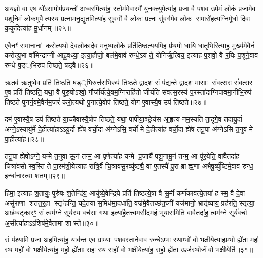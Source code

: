 {\anuvakamend[{भू॒या॒स्त॒ स्व॒स्तयेऽग्ने॑ पुष्यासं धृ॒षद्व॑र्ण॒मेका॒न्नत्रि॒ꣳ॒शच्च॑॥६॥}]}

अय॑ज्ञो॒ वा ए॒ष यो॑ऽसा॒मोप॑प्र॒यन्तो॑ अध्व॒रमित्या॑ह॒ स्तोम॑मे॒वास्मै॑ युन॒क्त्युपेत्या॑ह प्र॒जा वै प॒शव॒ उपे॒मं लो॒कं प्र॒जामे॒व प॒शूनि॒मं लो॒कमुपैत्य॒स्य प्र॒त्नामनु॒द्युत॒मित्या॑ह सुव॒र्गो वै लो॒कः प्र॒त्नः सु॑व॒र्गमे॒व लो॒क स॒मारो॑हत्य॒ग्निर्मू॒र्धा दि॒वः क॒कुदित्या॑ह मू॒र्धानम्॥२५॥

ए॒वैनꣳ॑ समा॒नानां करो॒त्यथो॑ देवलो॒कादे॒व म॑नुष्यलो॒के प्रति॑तिष्ठत्य॒यमि॒ह प्र॑थ॒मो धा॑यि धा॒तृभि॒रित्या॑ह॒ मुख्य॑मे॒वैनं॑ करोत्यु॒भा वा॑मिन्द्राग्नी आहु॒वध्या॒ इत्या॒हौजो॒ बल॑मे॒वाव॑ रुन्धे॒ऽयं ते॒ योनि॑र्\mbox{}ऋ॒त्विय॒ इत्या॑ह प॒शवो॒ वै र॒यिः प॒शूने॒वाव॑ रुन्धे ष॒ड््भिरुप॑ तिष्ठते॒ षड्वै॥२६॥

ऋ॒तव॑ ऋ॒तुष्वे॒व प्रति॑ तिष्ठति ष॒ड््भिरुत्त॑राभि॒रुप॑ तिष्ठते॒ द्वाद॑श॒ सं प॑द्यन्ते॒ द्वाद॑श॒ मासाः संवत्स॒रः सं॑वत्स॒र ए॒व प्रति॑ तिष्ठति॒ यथा॒ वै पुरु॒षोऽश्वो॒ गौर्जीर्य॑त्ये॒वम॒ग्निराहि॑तो जीर्यति संवत्स॒रस्य॑ प॒रस्ता॑दाग्निपावमा॒नीभि॒रुप॑ तिष्ठते पुनर्न॒वमे॒वैन॑म॒जरं॑ करो॒त्यथो॑ पु॒नात्ये॒वोप॑ तिष्ठते॒ योग॑ ए॒वास्यै॒ष उप॑ तिष्ठते॥२७॥

दम॑ ए॒वास्यै॒ष उप॑ तिष्ठते या॒च्ञैवास्यै॒षोप॑ तिष्ठते॒ यथा॒ पापी॑या॒ञ्छ्रेय॑स आ॒हृत्य॑ नम॒स्यति॑ ता॒दृगे॒व तदा॑यु॒र्दा अ॑ग्ने॒ऽस्यायु॑र्मे दे॒हीत्या॑हाऽऽयु॒र्दा ह्ये॑ष व॑र्चो॒दा अ॑ग्नेऽसि॒ वर्चो॑ मे दे॒हीत्या॑ह वर्चो॒दा ह्ये॑ष त॑नू॒पा अ॑ग्नेऽसि त॒नुवं॑ मे पा॒हीत्या॑ह॥२८॥

तनू॒पा ह्ये॑षोऽग्ने॒ यन्मे॑ त॒नुवा॑ ऊ॒नं तन्म॒ आ पृ॒णेत्या॑ह॒ यन्मे प्र॒जायै॑ पशू॒नामू॒नं तन्म॒ आ पू॑र॒येति॒ वावैतदा॑ह॒ चित्रा॑वसो स्व॒स्ति ते॑ पा॒रम॑शी॒येत्या॑ह॒ रात्रि॒र्वै चि॒त्राव॑सु॒रव्यु॑ष्ट्यै॒ वा ए॒तस्यै॑ पु॒रा ब्राह्म॒णा अ॑भैषु॒र्व्यु॑ष्टिमे॒वाव॑ रुन्ध॒ इन्धा॑नास्त्वा श॒तम्॥२९॥

हिमा॒ इत्या॑ह श॒तायुः॒ पुरु॑षः श॒तेन्द्रि॑य॒ आयु॑ष्ये॒वेन्द्रि॒ये प्रति॑ तिष्ठत्ये॒षा वै सू॒र्मी कर्ण॑कावत्ये॒तया॑ ह स्म॒ वै दे॒वा असु॑राणा शतत॒र्॒\mbox{}हा स्तृꣳ॑हन्ति॒ यदे॒तया॑ स॒मिध॑मा॒दधा॑ति॒ वज्र॑मे॒वैतच्छ॑त॒घ्नीं यज॑मानो॒ भ्रातृ॑व्याय॒ प्रह॑रति॒ स्तृत्या॒ अछ॑म्बट्कार॒ꣳ॒ सं त्वम॑ग्ने॒ सूर्य॑स्य॒ वर्च॑सा गथा॒ इत्या॑है॒तत्त्वमसी॒दम॒हं भू॑यास॒मिति॒ वावैतदा॑ह॒ त्वम॑ग्ने॒ सूर्य॑वर्चा अ॒सीत्या॑हा॒ऽऽशिष॑मे॒वैतामा शास्ते॥३०॥

{\anuvakamend[{मू॒र्धानं॒ वै तिष्ठ॑त आह श॒तम॒ह षोड॑श च॥७॥}]}

सं प॑श्यामि प्र॒जा अ॒हमित्या॑ह॒ याव॑न्त ए॒व ग्रा॒म्याः प॒शव॒स्ताने॒वाव॑ रु॒न्धेऽम्भः॒ स्थाम्भो॑ वो भक्षी॒येत्या॒हाम्भो॒ ह्ये॑ता महः॑ स्थ॒ महो॑ वो भक्षी॒येत्या॑ह॒ महो॒ ह्ये॑ताः सहः॑ स्थ॒ सहो॑ वो भक्षी॒येत्या॑ह॒ सहो॒ ह्ये॑ता ऊर्ज॒स्थोर्जं॑ वो भक्षी॒येति॑॥३१॥

